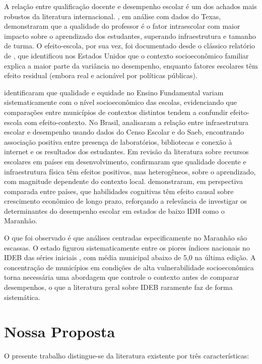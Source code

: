 A relação entre qualificação docente e desempenho escolar é um dos achados mais robustos da literatura internacional. \citet{rivkin2005}, em análise com dados do Texas, demonstraram que a qualidade do professor é o fator intraescolar com maior impacto sobre o aprendizado dos estudantes, superando infraestrutura e tamanho de turma. O efeito-escola, por sua vez, foi documentado desde o clássico relatório de \citet{coleman1966}, que identificou nos Estados Unidos que o contexto socioeconômico familiar explica a maior parte da variância no desempenho, enquanto fatores escolares têm efeito residual (embora real e acionável por políticas públicas).

\citet{albernaz2002} identificaram que qualidade e equidade no Ensino Fundamental variam sistematicamente com o nível socioeconômico das escolas, evidenciando que comparações entre municípios de contextos distintos tendem a confundir efeito-escola com efeito-contexto. No Brasil, \citet{vasconcelos2021} analisaram a relação entre infraestrutura escolar e desempenho usando dados do Censo Escolar e do Saeb, encontrando associação positiva entre presença de laboratórios, bibliotecas e conexão à internet e os resultados dos estudantes. Em revisão da literatura sobre recursos escolares em países em desenvolvimento, \citet{glewwe2014} confirmaram que qualidade docente e infraestrutura física têm efeitos positivos, mas heterogêneos, sobre o aprendizado, com magnitude dependente do contexto local. \citet{hanushek2012} demonstraram, em perspectiva comparada entre países, que habilidades cognitivas têm efeito causal sobre crescimento econômico de longo prazo, reforçando a relevância de investigar os determinantes do desempenho escolar em estados de baixo IDH como o Maranhão.

O que foi observado é que análises centradas especificamente no Maranhão são escassas. O estado figurou sistematicamente entre os piores índices nacionais no IDEB das séries iniciais \cite{inep2023}, com média municipal abaixo de 5,0 na última edição. A concentração de municípios em condições de alta vulnerabilidade socioeconômica torna necessária uma abordagem que controle o contexto antes de comparar desempenhos, o que a literatura geral sobre IDEB raramente faz de forma sistemática.

\section{Nossa Proposta}

O presente trabalho distingue-se da literatura existente por três características:

